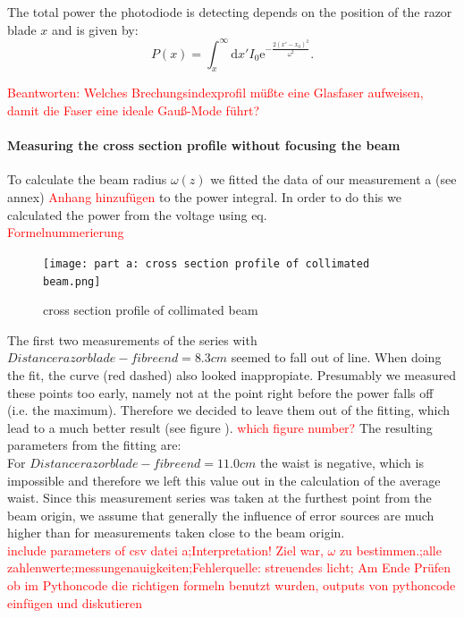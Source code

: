 \documentclass{article}
\begin{document}
The total power the photodiode is detecting depends on the position of the razor blade $x$ and is given by:
\begin{equation}
P(x) = \int_x^\infty\mathrm{d}x' I_0 \mathrm{e}^{-\frac{2(x'-x_0)^2}{\omega^2}}.
\end{equation}

\textcolor{red}{Beantworten: Welches Brechungsindexprofil müßte eine Glasfaser aufweisen, damit die Faser eine ideale Gauß-Mode führt?}

\paragraph{Measuring the cross section profile without focusing the beam}

To calculate the beam radius $\omega (z)$ we fitted the data of our measurement a (see annex)
\textcolor{red}{Anhang hinzufügen} %
to the power integral. In order to do this we calculated the power from the voltage using eq. \\
\textcolor{red}{Formelnummerierung}
\begin{figure}
\texttt{[image: part a: cross section profile of collimated beam.png]}
\caption{cross section profile of collimated beam}
\label{part_a_fig} %
\end{figure}

The first two measurements of the series with $Distance razor blade - fibre end = 8.3 cm$ seemed to fall out of line. When doing the fit, the curve (red dashed) also looked inappropiate. Presumably we measured these points too early, namely not at the point right before the power falls off (i.e. the maximum). Therefore we decided to leave them out of the fitting, which lead to a much better result (see figure ).
\textcolor{red}{which figure number?}
The resulting parameters from the fitting are: \\

For $Distance razor blade - fibre end = 11.0 cm$ the waist is negative, which is impossible and therefore we left this value out in the calculation of the average waist. Since this measurement series was taken at the furthest point from the beam origin, we assume that generally the influence of error sources are much higher than for measurements taken close to the beam origin.\\

\textcolor{red}{include parameters of csv datei a;Interpretation! Ziel war, $\omega$ zu bestimmen.;alle zahlenwerte;messungenauigkeiten;Fehlerquelle: streuendes licht; Am Ende Prüfen ob im Pythoncode die richtigen formeln benutzt wurden, outputs von pythoncode einfügen und diskutieren}
\end{document}
